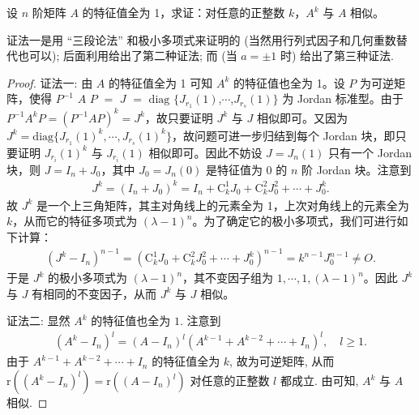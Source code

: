 \documentclass[../../main.tex]{subfiles}%
\begin{document}
\begin{proposition}\label{example:特征值全为1矩阵的任意幂次于原矩阵相似}
设 \(n\) 阶矩阵 \(A\) 的特征值全为 1，求证：对任意的正整数 \(k\)，\(A^k\) 与 \(A\) 相似。
\end{proposition}
\begin{remark}
{\color{blue}证法一}是用 “三段论法” 和极小多项式来证明的 (当然用行列式因子和几何重数替代也可以); 后面利用给出了第二种证法; 而 (当 $a = \pm 1$ 时) 给出了第三种证法. 
\end{remark}
\begin{proof}

{\color{blue}证法一:}
由 \(A\) 的特征值全为 1 可知 \(A^k\) 的特征值也全为 1。设 \(P\) 为可逆矩阵，使得 $P^{-1}$ $A$ $P$ $=$ $J$ $=$ $\mathrm{diag}$ $\{J_{r_1}(1)$,$\cdots$,$J_{r_s}(1)\}$ 为 Jordan 标准型。由于 \(P^{-1}A^kP=(P^{-1}AP)^k = J^k\)，故只要证明 \(J^k\) 与 \(J\) 相似即可。又因为 \(J^k=\mathrm{diag}\{J_{r_1}(1)^k,\cdots,J_{r_s}(1)^k\}\)，故问题可进一步归结到每个 Jordan 块，即只要证明 \(J_{r_i}(1)^k\) 与 \(J_{r_i}(1)\) 相似即可。因此不妨设 \(J = J_n(1)\) 只有一个 Jordan 块，则 \(J = I_n+J_0\)，其中 \(J_0 = J_n(0)\) 是特征值为 0 的 \(n\) 阶 Jordan 块。注意到
\begin{align*}
J^k=(I_n + J_0)^k
=I_n + \mathrm{C}_k^1J_0 + \mathrm{C}_k^2J_0^2+\cdots+J_0^k.
\end{align*}
故 \(J^k\) 是一个上三角矩阵，其主对角线上的元素全为 1，上次对角线上的元素全为 \(k\)，从而它的特征多项式为 \((\lambda - 1)^n\)。为了确定它的极小多项式，我们可进行如下计算：
\begin{align*}
(J^k - I_n)^{n - 1}=(\mathrm{C}_k^1J_0 + \mathrm{C}_k^2J_0^2+\cdots+J_0^k)^{n - 1}
=k^{n - 1}J_0^{n - 1}\neq O.
\end{align*}
于是 \(J^k\) 的极小多项式为 \((\lambda - 1)^n\)，其不变因子组为 \(1,\cdots,1,(\lambda - 1)^n\)。因此 \(J^k\) 与 \(J\) 有相同的不变因子，从而 \(J^k\) 与 \(J\) 相似。

{\color{blue}证法二:}
显然 $A^k$ 的特征值也全为 $1$. 注意到
\begin{align*}
(A^k - I_n)^l = (A - I_n)^l(A^{k - 1} + A^{k - 2} + \cdots + I_n)^l, \quad l \geqslant  1.
\end{align*}
由于 $A^{k - 1} + A^{k - 2} + \cdots + I_n$ 的特征值全为 $k$, 故为可逆矩阵, 从而 $\mathrm{r}((A^k - I_n)^l) = \mathrm{r}((A - I_n)^l)$ 对任意的正整数 $l$ 都成立. 由可知, $A^k$ 与 $A$ 相似. 
\end{proof}
\end{document}
